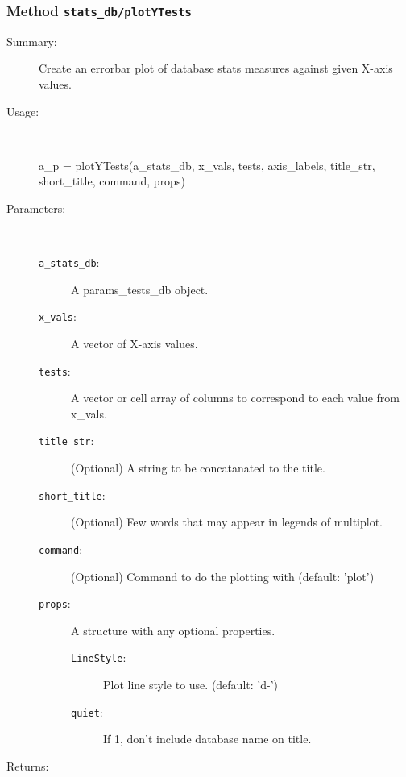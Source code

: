 \subsubsection[Method \texttt{plotYTests}]{Method \texttt{stats\_db/plotYTests}}%
%
\label{ref_stats_db__plotYTests}%
\hypertarget{ref_stats_db__plotYTests}{}%
\begin{description}
\item[Summary:]Create an errorbar plot of database stats measures against given X-axis values.
%
\item[Usage:]~%
\begin{lyxcode}%
a\_p = plotYTests(a\_stats\_db, x\_vals, tests, axis\_labels, title\_str, short\_title, command, props)
%
\end{lyxcode}%
%
%
\item[Parameters:]~
\begin{description}%
\item[\texttt{a\_stats\_db}:]
 A params\_tests\_db object.
\item[\texttt{x\_vals}:]
 A vector of X-axis values.
\item[\texttt{tests}:]
 A vector or cell array of columns to correspond to each value from x\_vals.
\item[\texttt{title\_str}:]
 (Optional) A string to be concatanated to the title.
\item[\texttt{short\_title}:]
 (Optional) Few words that may appear in legends of multiplot.
\item[\texttt{command}:]
 (Optional) Command to do the plotting with (default: 'plot')
\item[\texttt{props}:]
 A structure with any optional properties.
\begin{description}%
\item[\texttt{LineStyle}:]
 Plot line style to use. (default: 'd-')
\item[\texttt{quiet}:]
 If 1, don't include database name on title.
\end{description}%
\end{description}%
%
\item[Returns:
]~


\end{description}
